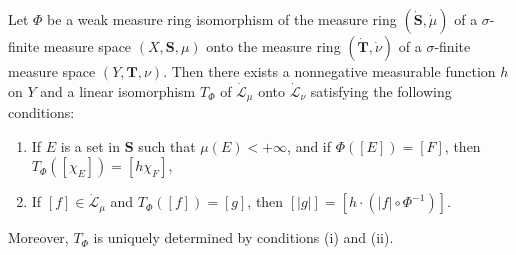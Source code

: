 Let $\Phi$ be a weak measure ring isomorphism of the measure ring $(\dot{\mathbf{S}}, \dot{\mu})$ of a $\sigma$-finite measure space $(X, \mathbf{S}, \mu)$ onto the measure ring $(\dot{\mathbf{T}}, \dot{\nu})$ of a $\sigma$-finite measure space $(Y, \mathbf{T}, \nu)$. Then there exists a nonnegative measurable function $h$ on $Y$ and a linear isomorphism $T_\Phi$ of $\dot{\mathcal{L}}_\mu$ onto $\dot{\mathcal{L}}_\nu$ satisfying the following conditions:

\begin{enumerate}
\item[(i)] If $E$ is a set in $\mathbf{S}$ such that $\mu(E) < +\infty$, and if $\Phi([E]) = [F]$, then $T_\Phi([\chi_E]) = [h\chi_F]$,
\item[(ii)] If $[f] \in \dot{\mathcal{L}}_\mu$ and $T_\Phi([f]) = [g]$, then $[|g|] = [h \cdot (|f| \circ \Phi^{-1})]$.
\end{enumerate}

Moreover, $T_\Phi$ is uniquely determined by conditions (i) and (ii).
